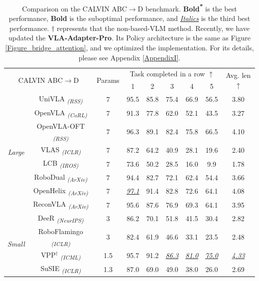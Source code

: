\begin{table}[!htbp]
    \centering
    \small
	\setlength{\tabcolsep}{1.2mm}
	\caption{Comparison on the CALVIN ABC$\to$D benchmark. \textbf{Bold\textsuperscript{*}} is the best performance, \textbf{Bold} is the suboptimal performance, and \underline{\textit{Italics}} is the third best performance. $\dag$ represents that the non-based-VLM method. Recently, we have updated the \textbf{VLA-Adapter-Pro}. Its Policy architecture is the same as Figure \ref{Figure_bridge_attention}, and we optimized the implementation. For its details, please see Appendix \ref{AppendixI}.}\label{ComparisonCALVIN}%
	\begin{tabular}{ccc|ccccc|c}
		\toprule[1pt]
		\multicolumn{2}{c}{\multirow{2}{*}{CALVIN ABC$\to$D}} &\multirow{2}{*}{Params}& \multicolumn{5}{c|}{Task completed in a row $\uparrow$} & \multirow{2}{*}{Avg. len $\uparrow$} \\
		\multicolumn{3}{c|}{} & 1     & 2     & 3     & 4     & 5     &\\
		\midrule[0.5pt]
		\multirow{8}{*}{\textit{Large}}&UniVLA \citep{UniVLA-2025} \textsubscript{\textit{(RSS)}} &7& 95.5  & 85.8  & 75.4  & 66.9  & 56.5  & 3.80\\
		&OpenVLA \citep{OpenVLA-2024} \textsubscript{\textit{(CoRL)}} &7& 91.3  & 77.8  & 62.0    & 52.1  & 43.5  & 3.27 \\	 
        & OpenVLA-OFT \citep{OpenVLA-OFT-2025} \textsubscript{\textit{(RSS)}}&7&96.3&89.1&82.4&75.8&66.5&4.10\\
		&VLAS \citep{VLAS-2025} \textsubscript{\textit{(ICLR)}}& 7 &87.2 &64.2& 40.9 &28.1 &19.6& 2.40\\
		&LCB \citep{LCB-2024} \textsubscript{\textit{(IROS)}} &7 & 73.6 & 50.2 & 28.5&16.0 & 9.9 & 1.78\\
		&RoboDual \citep{RoboDual-2024} \textsubscript{\textit{(ArXiv)}} &7& 94.4  & 82.7  & 72.1  & 62.4  & 54.4  & 3.66 \\
		&OpenHelix \citep{OpenHelix-2025} \textsubscript{\textit{(ArXiv)}} &7& \underline{\textit{97.1}} & 91.4 & 82.8 & 72.6 & 64.1 & 4.08 \\
        & ReconVLA \citep{ReconVLA-2025} \textsubscript{\textit{(ArXiv)}}&7&95.6 &87.6& 76.9& 69.3 &64.1& 3.95\\
        
		\midrule[0.5pt]
		\multirow{4}{*}{\textit{Small}}&DeeR \citep{DeeR-2024} \textsubscript{\textit{(NeurIPS)}} & 3&86.2  & 70.1  & 51.8  & 41.5  & 30.4  & 2.82 \\	
		&RoboFlamingo \citep{RoboFlamingo-2024} \textsubscript{\textit{(ICLR)}} &3& 82.4  & 61.9  & 46.6  & 33.1  & 23.5  & 2.48 \\
        &VPP$^{\dag}$ \citep{VPP-2025} \textsubscript{\textit{(ICML)}} &1.5& 95.7  & 91.2  & \underline{\textit{86.3}} & \underline{\textit{81.0}} & \underline{\textit{75.0}} & \underline{\textit{4.33}} \\
		&SuSIE \citep{SuSIE-2024} \textsubscript{\textit{(ICLR)}} &1.3& 87.0    & 69.0    & 49.0    & 38.0    & 26.0    & 2.69 \\


\end{tabular}
\end{table}
